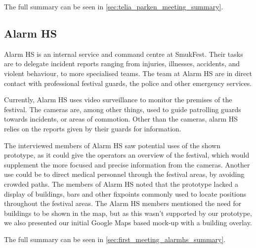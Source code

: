 The full summary can be seen in \cref{sec:telia_parken_meeting_summary}.


\subsection{Alarm HS}
Alarm HS is an internal service and command centre at SmukFest. Their tasks are to delegate incident reports ranging from injuries, illnesses, accidents, and violent behaviour, to more specialised teams. The team at Alarm HS are in direct contact with professional festival guards, the police and other emergency services. 

Currently, Alarm HS uses video surveillance to monitor the premises of the festival. The cameras are, among other things, used to guide patrolling guards towards incidents, or areas of commotion. Other than the cameras, alarm HS relies on the reports given by their guards for information.

The interviewed members of Alarm HS saw potential uses of the shown prototype, as it could give the operators an overview of the festival, which would supplement the more focused and precise information from the cameras. Another use could be to direct medical personnel through the festival areas, by avoiding crowded paths. The members of Alarm HS noted that the prototype lacked a display of buildings, bars and other fixpoints commonly used to locate positions throughout the festival areas. The Alarm HS members mentioned the need for buildings to be shown in the map, but as this wasn't supported by our prototype, we also presented our initial Google Maps based mock-up with a building overlay.

The full summary can be seen in \cref{sec:first_meeting_alarmhs_summary}.